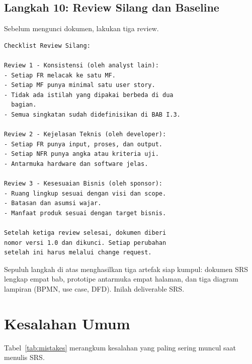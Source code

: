 \documentclass[11pt,a4paper]{article}
\begin{document}
\subsection{Langkah 10: Review Silang dan Baseline}

Sebelum mengunci dokumen, lakukan tiga review.

\begin{lstlisting}[style=out]
Checklist Review Silang:

Review 1 - Konsistensi (oleh analyst lain):
- Setiap FR melacak ke satu MF.
- Setiap MF punya minimal satu user story.
- Tidak ada istilah yang dipakai berbeda di dua
  bagian.
- Semua singkatan sudah didefinisikan di BAB I.3.

Review 2 - Kejelasan Teknis (oleh developer):
- Setiap FR punya input, proses, dan output.
- Setiap NFR punya angka atau kriteria uji.
- Antarmuka hardware dan software jelas.

Review 3 - Kesesuaian Bisnis (oleh sponsor):
- Ruang lingkup sesuai dengan visi dan scope.
- Batasan dan asumsi wajar.
- Manfaat produk sesuai dengan target bisnis.

Setelah ketiga review selesai, dokumen diberi
nomor versi 1.0 dan dikunci. Setiap perubahan
setelah ini harus melalui change request.
\end{lstlisting}

Sepuluh langkah di atas menghasilkan tiga artefak siap kumpul: dokumen SRS lengkap empat bab, prototipe antarmuka empat halaman, dan tiga diagram lampiran (BPMN, use case, DFD). Inilah deliverable SRS.

\section{Kesalahan Umum}

Tabel~\ref{tab:mistakes} merangkum kesalahan yang paling sering muncul saat menulis SRS.
\end{document}

